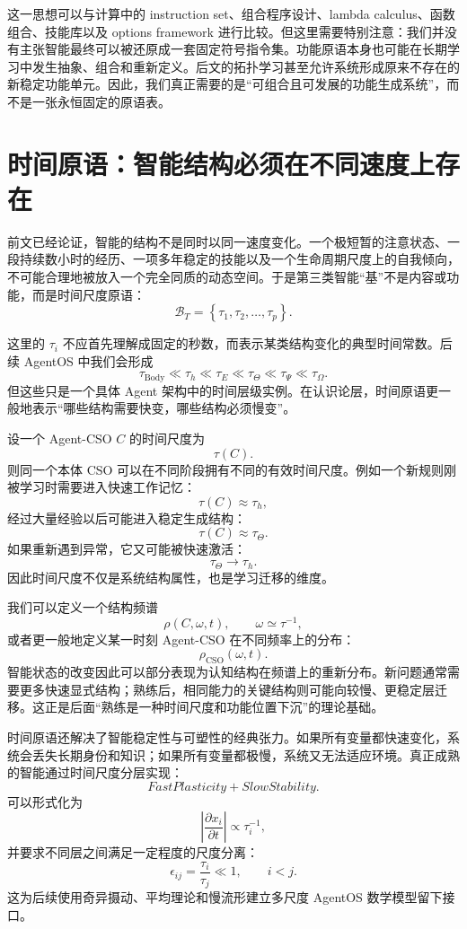 这一思想可以与计算中的 instruction set、组合程序设计、lambda calculus、函数组合、技能库以及 options framework 进行比较。但这里需要特别注意：我们并没有主张智能最终可以被还原成一套固定符号指令集。功能原语本身也可能在长期学习中发生抽象、组合和重新定义。后文的拓扑学习甚至允许系统形成原来不存在的新稳定功能单元。因此，我们真正需要的是“可组合且可发展的功能生成系统”，而不是一张永恒固定的原语表。

\section{时间原语：智能结构必须在不同速度上存在}

前文已经论证，智能的结构不是同时以同一速度变化。一个极短暂的注意状态、一段持续数小时的经历、一项多年稳定的技能以及一个生命周期尺度上的自我倾向，不可能合理地被放入一个完全同质的动态空间。于是第三类智能“基”不是内容或功能，而是时间尺度原语：
\[
\boxed{
\mathcal B_T
=
\left\{
\tau_1,\tau_2,\ldots,\tau_p
\right\}.
}
\]

这里的 $\tau_i$ 不应首先理解成固定的秒数，而表示某类结构变化的典型时间常数。后续 AgentOS 中我们会形成
\[
\tau_{\mathrm{Body}}
\ll
\tau_h
\ll
\tau_E
\ll
\tau_\Theta
\ll
\tau_\Psi
\ll
\tau_\Omega.
\]
但这些只是一个具体 Agent 架构中的时间层级实例。在认识论层，时间原语更一般地表示“哪些结构需要快变，哪些结构必须慢变”。

设一个 Agent-CSO $C$ 的时间尺度为
\[
\tau(C).
\]
则同一个本体 CSO 可以在不同阶段拥有不同的有效时间尺度。例如一个新规则刚被学习时需要进入快速工作记忆：
\[
\tau(C)\approx\tau_h,
\]
经过大量经验以后可能进入稳定生成结构：
\[
\tau(C)\approx\tau_\Theta.
\]
如果重新遇到异常，它又可能被快速激活：
\[
\tau_\Theta
\rightarrow
\tau_h.
\]
因此时间尺度不仅是系统结构属性，也是学习迁移的维度。

我们可以定义一个结构频谱
\[
\rho(C,\omega,t),
\qquad
\omega\simeq\tau^{-1},
\]
或者更一般地定义某一时刻 Agent-CSO 在不同频率上的分布：
\[
\rho_{\mathrm{CSO}}(\omega,t).
\]
智能状态的改变因此可以部分表现为认知结构在频谱上的重新分布。新问题通常需要更多快速显式结构；熟练后，相同能力的关键结构则可能向较慢、更稳定层迁移。这正是后面“熟练是一种时间尺度和功能位置下沉”的理论基础。

时间原语还解决了智能稳定性与可塑性的经典张力。如果所有变量都快速变化，系统会丢失长期身份和知识；如果所有变量都极慢，系统又无法适应环境。真正成熟的智能通过时间尺度分层实现：
\[
FastPlasticity
+
SlowStability.
\]
可以形式化为
\[
\left|
\frac{\partial x_i}{\partial t}
\right|
\propto
\tau_i^{-1},
\]
并要求不同层之间满足一定程度的尺度分离：
\[
\epsilon_{ij}
=
\frac{\tau_i}{\tau_j}
\ll 1,
\qquad
i<j.
\]
这为后续使用奇异摄动、平均理论和慢流形建立多尺度 AgentOS 数学模型留下接口。

